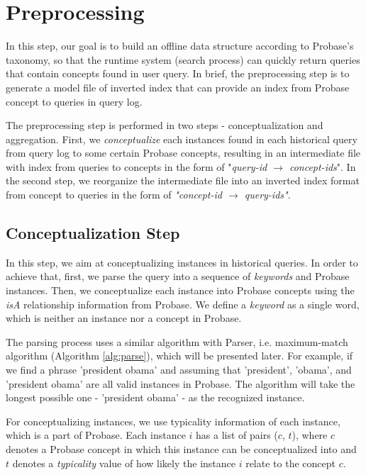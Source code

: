 \section{Preprocessing}
In this step, our goal is to build an offline data structure according to Probase's taxonomy, so that the runtime system (search process) can quickly return queries that contain concepts found in user query. In brief, the preprocessing step is to generate a model file of inverted index that can provide an index from Probase concept to queries in query log.

The preprocessing step is performed in two steps - conceptualization and aggregation. First, we \textit{conceptualize} each instances found in each historical query from query log to some certain Probase concepts, resulting in an intermediate file with index from queries to concepts in the form of "\textit{query-id $\to$ concept-ids}". In the second step, we reorganize the intermediate file into an inverted index format from concept to queries in the form of \textit{"concept-id $\to$ query-ids"}.

\subsection{Conceptualization Step}
In this step, we aim at conceptualizing instances in historical queries. In order to achieve that, first, we parse the query into a sequence of \textit{keywords} and Probase instances. Then, we conceptualize each instance into Probase concepts using the \textit{isA} relationship information from Probase. We define a \textit{keyword} as a single word, which is neither an instance nor a concept in Probase.

The parsing process uses a similar algorithm with Parser, i.e. maximum-match algorithm (Algorithm \ref{alg:parse}), 
which will be presented later. For example, if we find a phrase 'president obama' and assuming that 'president', 
'obama', and 'president obama' are all valid instances in Probase. The algorithm will take the longest possible 
one - 'president obama' - as the recognized instance.

For conceptualizing instances, we use typicality information of each instance, which is a part of Probase. Each 
instance $i$ has a list of pairs ($c$, $t$), where $c$ denotes a Probase concept in which this instance can be 
conceptualized into and $t$ denotes a \textit{typicality} value of how likely the instance $i$ relate to the 
concept $c$.

